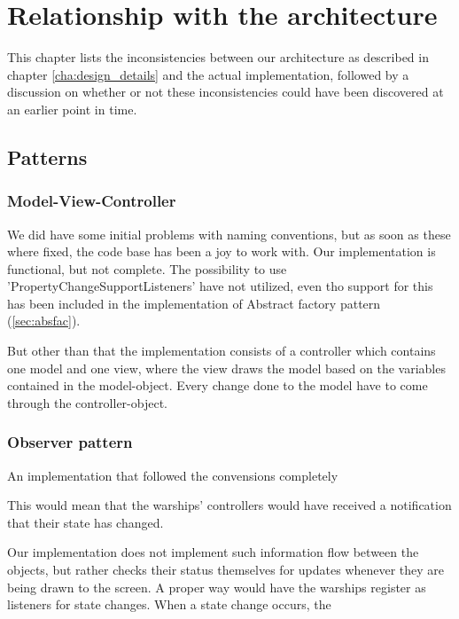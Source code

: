 \chapter{Relationship with the architecture}
\label{cha:relationship_with_the_architecture}

This chapter lists the inconsistencies between our architecture as described in chapter \ref{cha:design_details} and the actual implementation, followed by a discussion on whether or not these inconsistencies could have been discovered at an earlier point in time.



\section{Patterns}

\subsection{Model-View-Controller}
\label{sec:mvc}

We did have some initial problems with naming conventions, but as soon as these where fixed, the code base has been a joy to work with.
Our implementation is functional, but not complete. The possibility to use 'PropertyChangeSupportListeners' have not utilized, even tho support for this has been included in the implementation of Abstract factory pattern (\ref{sec:absfac}).

But other than that the implementation consists of a controller which contains one model and one view, where the view draws the model based on the variables contained in the model-object. Every change done to the model have to come through the controller-object.


\subsection{Observer pattern}

An implementation that followed the convensions completely

This would mean that the warships' controllers would have received a notification that their state has changed.

Our implementation does not implement such information flow between the objects, but rather checks their status themselves for updates whenever they are being drawn to the screen.
A proper way would have the warships register as listeners for state changes. When a state change occurs, the 

